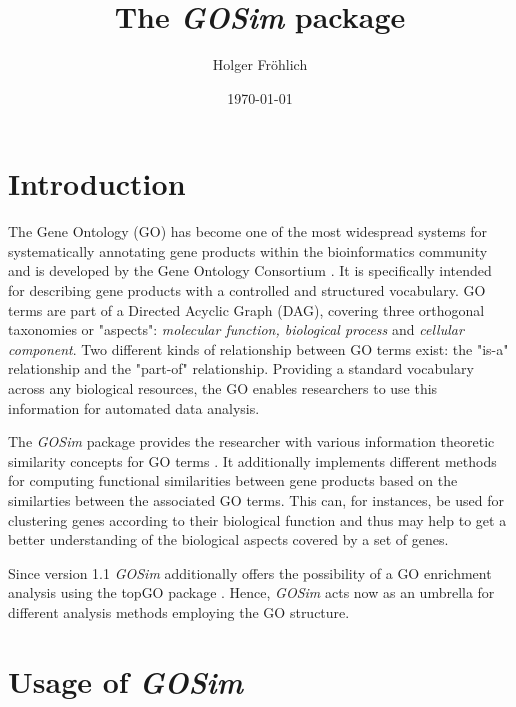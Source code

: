 \documentclass[12pt,a4paper]{article}
\begin{document}
\author{Holger Fr\"ohlich}

\title{The \emph{GOSim} package}
\date{\today}
\maketitle

\section{Introduction}

The Gene Ontology (GO) has become one of the most widespread systems for systematically annotating gene products within the bioinformatics community and is developed by the Gene Ontology Consortium \cite{GOConsortium04}. It is specifically intended for describing gene products with a controlled and structured vocabulary. GO terms are part of a Directed Acyclic Graph (DAG), covering three orthogonal taxonomies or "aspects": \emph{molecular function, biological process} and \emph{cellular component}. Two different kinds of relationship between GO terms exist: the "is-a" relationship and the "part-of" relationship.
Providing a standard vocabulary across any biological resources, the GO enables researchers to use this information for automated data analysis.

The \emph{GOSim} package \cite{Froehlich2007GOSim} provides the researcher with various information theoretic similarity concepts for GO terms \cite{Resnik95, Resnik99, Lin98, Jiang98, Lord03, Couto2003FuSSiMeg, Couto2005GraSM}. It additionally implements different methods for computing functional similarities between gene products based on the similarties between the associated GO terms. This can, for instances, be used for clustering genes according to their biological function \cite{FroeGO05, FroeSpeerGOKer06} and thus may help to get a better understanding of the biological aspects covered by a set of genes. 

Since version 1.1 \emph{GOSim} additionally offers the possibility of a GO enrichment analysis using the topGO package \cite{Alexa2006topGO}. Hence, \emph{GOSim} acts now as an umbrella for different analysis methods employing the GO structure.

\section{Usage of \emph{GOSim}}
\end{document}
